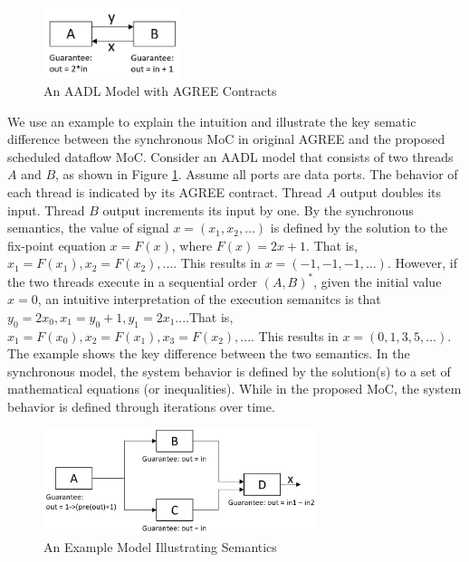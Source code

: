 \begin{figure}[ht!]
\centering
\includegraphics[width=40mm]{example1.jpg}
\caption{An AADL Model with AGREE Contracts\label{motivationFig1}}
\end{figure}

We use an example to explain the intuition and illustrate the key sematic difference between the synchronous MoC in original AGREE and the proposed scheduled dataflow MoC.
Consider an AADL model that consists of two threads $A$ and $B$, as shown in Figure \ref{motivationFig1}. Assume all ports are data ports. The behavior of each thread is indicated by its AGREE contract. Thread $A$ output doubles its input. Thread $B$ output increments its input by one. By the synchronous semantics, the value of signal $x = (x_1, x_2, ...)$ is defined by the solution to the fix-point equation $x = F(x)$, where $F(x) = 2x + 1$. That is, $x_1 = F(x_1), x_2 = F(x_2),...$. This results in $x = (-1, -1, -1,…)$. However, if the two threads execute in a sequential order $(A,B)^*$, given the initial value $x = 0$, an intuitive interpretation of the execution semanitcs is that $y_0 = 2x_0, x_1 = y_0+1, y_1 = 2x_1...$.That is, $x_1 = F(x_0), x_2 = F(x_1), x_3 = F(x_2),...$. This results in $x = (0, 1, 3, 5,…)$. The example shows the key difference between the two semantics. In the synchronous model, the system behavior is defined by the solution(s) to a set of mathematical equations (or inequalities). While in the proposed MoC, the system behavior is defined through iterations over time.

\begin{figure}[ht!]
\centering
\includegraphics[width=80mm]{motivationalexample1.jpg}
\caption{An Example Model Illustrating Semantics\label{motivationFig2}}
\end{figure}

